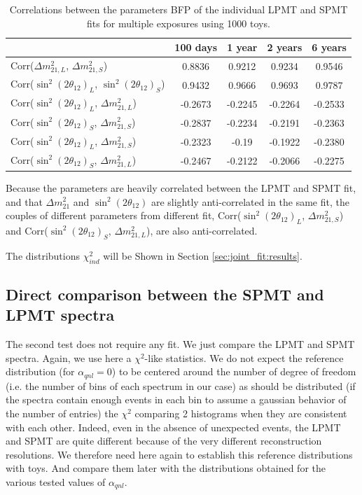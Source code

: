 \documentclass[../main.tex]{subfiles}
\begin{document}
\begin{table}
  \centering
  \begin{tabular}{l|c|c|c|c}
                                                                  & 100 days & 1 year & 2 years & 6 years \\
    \hline
    \hline
    Corr($\Delta m^2_{21,L}$,  $\Delta m^2_{21,S}$)               & 0.8836   & 0.9212 & 0.9234  & 0.9546 \\
    Corr($\sin^2(2\theta_{12})_{L}$, $\sin^2(2\theta_{12})_{S}$)  & 0.9432   & 0.9666 & 0.9693  & 0.9787 \\
    \hline
    Corr($\sin^2(2\theta_{12})_{L}$, $\Delta m^2_{21,L}$)         & -0.2673 & -0.2245 & -0.2264 & -0.2533 \\
    Corr($\sin^2(2\theta_{12})_{S}$, $\Delta m^2_{21,S}$)         & -0.2837 & -0.2234 & -0.2191 & -0.2363 \\
    \hline
    Corr($\sin^2(2\theta_{12})_{L}$, $\Delta m^2_{21,S}$)         & -0.2323 & -0.19   & -0.1922 & -0.2380 \\
    Corr($\sin^2(2\theta_{12})_{S}$, $\Delta m^2_{21,L}$)         & -0.2467 & -0.2122 & -0.2066 & -0.2275 \\
  \end{tabular}
  \caption{Correlations between the parameters BFP of the individual LPMT and SPMT fits for multiple exposures using 1000 toys.}
  \label{tab:joint_fit:ind_corr}
\end{table}

Because the parameters are heavily correlated between the LPMT and SPMT fit, and that $\Delta m^2_{21}$ and $\sin^2(2\theta_{12})$ are slightly anti-correlated in the same fit, the couples of different parameters from different fit, Corr($\sin^2(2\theta_{12})_{L}$, $\Delta m^2_{21,S}$) and Corr($\sin^2(2\theta_{12})_{S}$, $\Delta m^2_{21,L}$), are also anti-correlated.

The distributions $\chi^2_{ind}$ will be Shown in Section \ref{sec:joint_fit:results}.


\subsection{Direct comparison between the SPMT and LPMT spectra}
\label{sec:joint_fit:compar}

The second test does not require any fit. We just compare the LPMT and SPMT spectra. Again, we use here a $\chi^2$-like statistics.
We do not expect the reference distribution (for $\alpha_{qnl}=0$) to be centered around the number of degree of freedom (i.e. the number of bins of each spectrum in our case) as should be distributed (if the spectra contain enough events in each bin to assume a gaussian behavior of the number of entries) the $\chi^2$ comparing 2 histograms when they are consistent with each other. Indeed, even in the absence of unexpected events, the LPMT and SPMT are quite different because of the very different reconstruction resolutions. We therefore need here again to establish this reference distributions with toys. And compare them later with the distributions obtained for the various tested values of $\alpha_{qnl}$.
\end{document}
